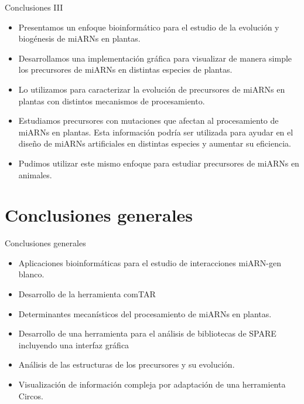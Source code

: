 \documentclass{beamer}
\begin{document}
\begin{frame}{Conclusiones III}
	\begin{itemize}
        \item<1-> Presentamos un enfoque bioinformático para el estudio de la evolución y biogénesis de miARNs en plantas.
        \item<2-> Desarrollamos una implementación gráfica para visualizar de manera simple los precursores de miARNs en distintas especies de plantas.
        \item<3-> Lo utilizamos para caracterizar la evolución de precursores de miARNs en plantas con distintos mecanismos de procesamiento.
        \item<4-> Estudiamos precursores con mutaciones que afectan al procesamiento de miARNs en plantas. 
        Esta información podría ser utilizada para ayudar en el diseño de miARNs artificiales en distintas especies y aumentar su eficiencia.
        \item<5-> Pudimos utilizar este mismo enfoque para estudiar precursores de miARNs en animales.

	\end{itemize}
\end{frame}

\section{Conclusiones generales}

\begin{frame}{Conclusiones generales}
	\begin{itemize}
        \item<1-> Aplicaciones bioinformáticas para el estudio de interacciones miARN-gen blanco.
        \item<2-> Desarrollo de la herramienta comTAR
        \item<3-> Determinantes mecanísticos del procesamiento de miARNs en plantas.
        \item<4-> Desarrollo de una herramienta para el análisis de bibliotecas de SPARE incluyendo una interfaz gráfica
        \item<5-> Análisis de las estructuras de los precursores y su evolución. 
        \item<6-> Visualización de información compleja por adaptación de una herramienta Circos.
    \end{itemize}
\end{frame}

\end{document}
